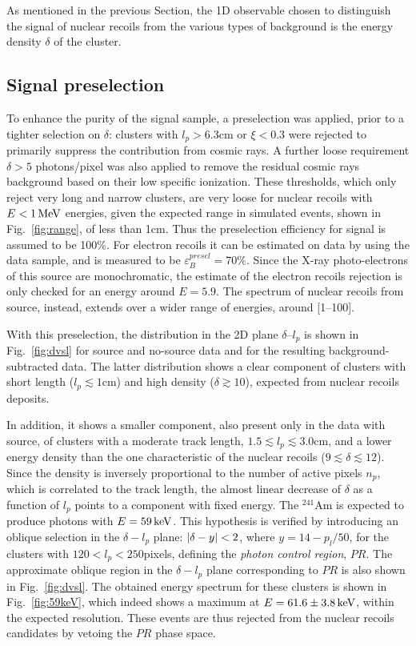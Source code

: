 As mentioned in the previous Section, the 1D observable chosen to
distinguish the signal of nuclear recoils from the various types of
background is the energy density $\delta$ of the cluster.

\subsection{Signal preselection}
To enhance the purity of the signal sample, a preselection was
applied, prior to a tighter selection on $\delta$: clusters with
$l_p>6.3$\unit{cm} or $\xi<0.3$ were rejected to primarily suppress
the contribution from cosmic rays. A further loose requirement
$\delta>5$ photons/pixel was also applied to remove the residual
cosmic rays background based on their low specific ionization. These
thresholds, which only reject very long and narrow clusters, are very
loose for nuclear recoils with $E<1\,\textrm{Me\hspace{-.08em}V}$ energies, given the expected
range in simulated events, shown in Fig.~\ref{fig:range}, of less than
1\unit{cm}. Thus the preselection efficiency for signal is assumed to
be 100\%. For electron recoils it can be estimated on data by using
the \fe data sample, and is measured to be
$\varepsilon_{B}^{presel}=70\%$. Since the X-ray photo-electrons of
this source are monochromatic, the estimate of the electron recoils
rejection is only checked for an energy around $E=5.9$\keV. The
spectrum of nuclear recoils from \ambe source, instead, extends over a
wider range of energies, around [1--100]\keV.

With this preselection, the distribution in the 2D plane
$\delta$--$l_p$ is shown in Fig.~\ref{fig:dvsl} for \ambe source and
no-source data and for the resulting background-subtracted \ambe data.
The latter distribution shows a clear component of clusters with short
length ($l_p\lesssim1$\unit{cm}) and high density ($\delta\gtrsim
10$), expected from nuclear recoils deposits.

In addition, it shows a smaller component, also present only in the
data with \ambe source, of clusters with a moderate track length,
$1.5 \lesssim l_p \lesssim 3.0$\unit{cm}, and a lower energy density
than the one characteristic of the nuclear recoils
($9\lesssim\delta\lesssim12$). Since the density is inversely
proportional to the number of active pixels $n_p$, which is correlated
to the track length, the almost linear decrease of $\delta$ as a
function of $l_p$ points to a component with fixed energy. The
$^{241}$Am is expected to produce photons with $E=59\,\textrm{ke\hspace{-.08em}V}$. This
hypothesis is verified by introducing an oblique selection in the
$\delta-l_p$ plane: $\vert \delta-y \vert<2$, where $y=14-p_l/50$, for the
clusters with $120<l_p<250$\unit{pixels}, defining the \textit{photon
control region}, $PR$. The approximate oblique region in the
$\delta-l_p$ plane corresponding to $PR$ is also shown in
Fig.~\ref{fig:dvsl}.  The obtained energy spectrum for these clusters
is shown in Fig.~\ref{fig:59keV}, which indeed shows a maximum at
$E=61.6\pm3.8\,\textrm{ke\hspace{-.08em}V}$, within the expected resolution. These events are
thus rejected from the nuclear recoils candidates by vetoing the $PR$
phase space.

